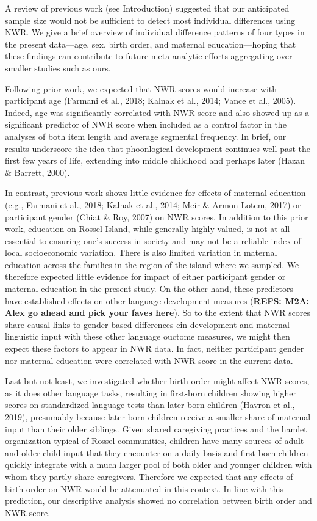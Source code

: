 \documentclass[english,,man,floatsintext]{apa6}
\begin{document}
A review of previous work (see Introduction) suggested that our anticipated sample size would not be sufficient to detect most individual differences using NWR. We give a brief overview of individual difference patterns of four types in the present data---age, sex, birth order, and maternal education---hoping that these findings can contribute to future meta-analytic efforts aggregating over smaller studies such as ours.

Following prior work, we expected that NWR scores would increase with participant age (Farmani et al., 2018; Kalnak et al., 2014; Vance et al., 2005). Indeed, age was significantly correlated with NWR score and also showed up as a significant predictor of NWR score when included as a control factor in the analyses of both item length and average segmental frequency. In brief, our results underscore the idea that phoonlogical development continues well past the first few years of life, extending into middle childhood and perhaps later (Hazan \& Barrett, 2000).

In contrast, previous work shows little evidence for effects of maternal education (e.g., Farmani et al., 2018; Kalnak et al., 2014; Meir \& Armon-Lotem, 2017) or participant gender (Chiat \& Roy, 2007) on NWR scores. In addition to this prior work, education on Rossel Island, while generally highly valued, is not at all essential to ensuring one's success in society and may not be a reliable index of local socioeconomic variation. There is also limited variation in maternal education across the families in the region of the island where we sampled. We therefore expected little evidence for impact of either participant gender or maternal education in the present study. On the other hand, these predictors have established effects on other language development measures (\textbf{REFS: M2A: Alex go ahead and pick your faves here}). So to the extent that NWR scores share causal links to gender-based differences ein development and maternal linguistic input with these other language ouctome measures, we might then expect these factors to appear in NWR data. In fact, neither participant gender nor maternal education were correlated with NWR score in the current data.

Last but not least, we investigated whether birth order might affect NWR scores, as it does other language tasks, resulting in first-born children showing higher scores on standardized language tests than later-born children (Havron et al., 2019), presumably because later-born children receive a smaller share of maternal input than their older siblings. Given shared caregiving practices and the hamlet organization typical of Rossel communities, children have many sources of adult and older child input that they encounter on a daily basis and first born children quickly integrate with a much larger pool of both older and younger children with whom they partly share caregivers. Therefore we expected that any effects of birth order on NWR would be attenuated in this context. In line with this prediction, our descriptive analysis showed no correlation between birth order and NWR score.
\end{document}
